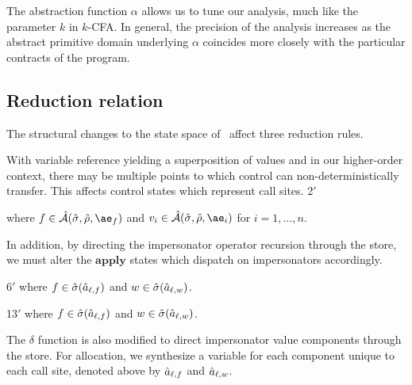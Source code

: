 The abstraction function $\alpha$ allows us to tune our analysis, much like the parameter $k$ in $k$-CFA.
In general, the precision of the analysis increases as the abstract primitive domain underlying $\alpha$ coincides more closely with the particular contracts of the program.

\subsection{Reduction relation}

The structural changes to the state space of \chapcalc\ affect three reduction rules.

With variable reference yielding a superposition of values and in our higher-order context, there may be multiple points to which control can non-deterministically transfer.
This affects control states which represent call sites.
\noindent
{}
      {}
      {2$'$}

\noindent
where $f\in\Aaval{\ae_f}$ and $v_i\in\Aaval{\ae_i}$ for $i=1,\dots,n$.

In addition, by directing the impersonator operator recursion through the store, we must alter the $\mathbf{apply}$ states which dispatch on impersonators accordingly.

     {}
     {6$'$}
\noindent
where $f\in\hat{\sigma}(\hat{a}_{\ell,f})$ and $w\in\hat{\sigma}(\hat{a}_{\ell,w})$.
     
     {}
     {13$'$}
where $f\in\hat{\sigma}(\hat{a}_{\ell,f})$ and $w\in\hat{\sigma}(\hat{a}_{\ell,w})$.

%

The $\delta$ function is also modified to direct impersonator value components through the store.
For allocation, we synthesize a variable for each component unique to each call site, denoted above by $\hat{a}_{\ell,f}$ and $\hat{a}_{\ell,w}$.

